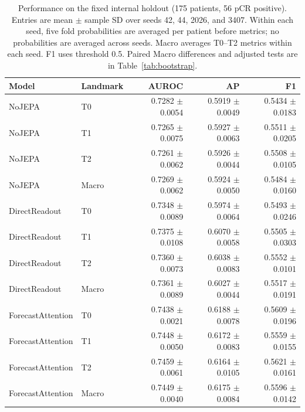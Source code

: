 \begin{table}[t]
\centering
\small
\caption{Performance on the fixed internal holdout (175 patients, 56 pCR positive). Entries are mean $\pm$ sample SD over seeds 42, 44, 2026, and 3407. Within each seed, five fold probabilities are averaged per patient before metrics; no probabilities are averaged across seeds. Macro averages T0--T2 metrics within each seed. F1 uses threshold 0.5. Paired Macro differences and adjusted tests are in Table~\ref{tab:bootstrap}.}
\label{tab:main}
\begin{tabular}{llrrr}
\toprule
Model & Landmark & AUROC & AP & F1 \\
\midrule
NoJEPA & T0 & 0.7282 $\pm$ 0.0054 & 0.5919 $\pm$ 0.0049 & 0.5434 $\pm$ 0.0183 \\
NoJEPA & T1 & 0.7265 $\pm$ 0.0075 & 0.5927 $\pm$ 0.0063 & 0.5511 $\pm$ 0.0205 \\
NoJEPA & T2 & 0.7261 $\pm$ 0.0062 & 0.5926 $\pm$ 0.0044 & 0.5508 $\pm$ 0.0105 \\
NoJEPA & Macro & 0.7269 $\pm$ 0.0062 & 0.5924 $\pm$ 0.0050 & 0.5484 $\pm$ 0.0160 \\
DirectReadout & T0 & 0.7348 $\pm$ 0.0089 & 0.5974 $\pm$ 0.0064 & 0.5493 $\pm$ 0.0246 \\
DirectReadout & T1 & 0.7375 $\pm$ 0.0108 & 0.6070 $\pm$ 0.0058 & 0.5505 $\pm$ 0.0303 \\
DirectReadout & T2 & 0.7360 $\pm$ 0.0073 & 0.6038 $\pm$ 0.0083 & 0.5552 $\pm$ 0.0101 \\
DirectReadout & Macro & 0.7361 $\pm$ 0.0089 & 0.6027 $\pm$ 0.0044 & 0.5517 $\pm$ 0.0191 \\
ForecastAttention & T0 & 0.7438 $\pm$ 0.0021 & 0.6188 $\pm$ 0.0078 & 0.5609 $\pm$ 0.0196 \\
ForecastAttention & T1 & 0.7448 $\pm$ 0.0050 & 0.6172 $\pm$ 0.0083 & 0.5559 $\pm$ 0.0155 \\
ForecastAttention & T2 & 0.7459 $\pm$ 0.0061 & 0.6164 $\pm$ 0.0105 & 0.5621 $\pm$ 0.0161 \\
ForecastAttention & Macro & 0.7449 $\pm$ 0.0040 & 0.6175 $\pm$ 0.0084 & 0.5596 $\pm$ 0.0142 \\
\bottomrule
\end{tabular}
\end{table}

